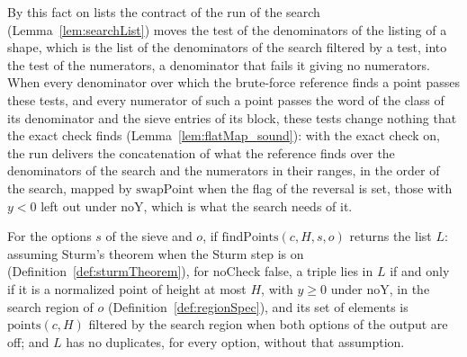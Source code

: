 By this fact on lists the contract of the run of the search (Lemma~\ref{lem:searchList}) moves the
test of the denominators of the listing of a shape, which is the list of the denominators of the
search filtered by a test, into the test of the numerators, a denominator that fails it giving no
numerators. When every denominator over which the brute-force reference finds a point passes these
tests, and every numerator of such a point passes the word of the class of its denominator and the
sieve entries of its block, these tests change nothing that the exact check finds
(Lemma~\ref{lem:flatMap_sound}): with the exact check on, the run delivers the concatenation of what
the reference finds over the denominators of the search and the numerators in their ranges, in the
order of the search, mapped by $\mathrm{swapPoint}$ when the flag of the reversal is set, those with
$y < 0$ left out under $\mathrm{noY}$, which is what the search needs of it.

\begin{theorem}\label{thm:findPoints}
  \leanok
  For the options $s$ of the sieve and $o$, if $\mathrm{findPoints}(c, H, s, o)$ returns the list
  $L$: assuming Sturm's theorem when the Sturm step is on (Definition~\ref{def:sturmTheorem}), for
  $\mathrm{noCheck}$ false, a triple lies in $L$ if and only if it is a normalized point of height
  at most $H$, with $y \ge 0$ under $\mathrm{noY}$, in the search region of $o$
  (Definition~\ref{def:regionSpec}), and its set of elements is $\mathrm{points}(c, H)$ filtered by
  the search region when both options of the output are off; and $L$ has no duplicates, for every
  option, without that assumption.
\end{theorem}

